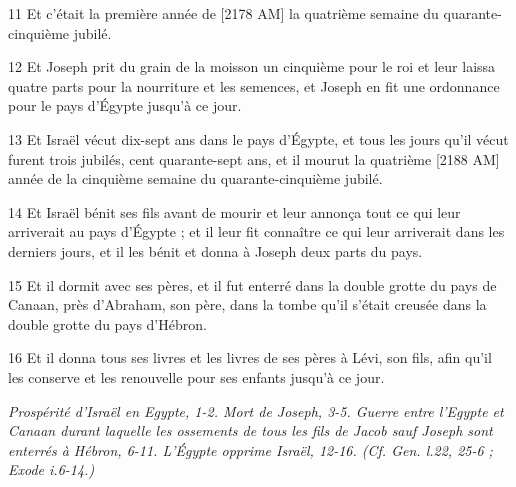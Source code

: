 \par 11 Et c'était la première année de [2178 AM] la quatrième semaine du quarante-cinquième jubilé.
\par 12 Et Joseph prit du grain de la moisson un cinquième pour le roi et leur laissa quatre parts pour la nourriture et les semences, et Joseph en fit une ordonnance pour le pays d'Égypte jusqu'à ce jour.
\par 13 Et Israël vécut dix-sept ans dans le pays d'Égypte, et tous les jours qu'il vécut furent trois jubilés, cent quarante-sept ans, et il mourut la quatrième [2188 AM] année de la cinquième semaine du quarante-cinquième jubilé.
\par 14 Et Israël bénit ses fils avant de mourir et leur annonça tout ce qui leur arriverait au pays d'Égypte ; et il leur fit connaître ce qui leur arriverait dans les derniers jours, et il les bénit et donna à Joseph deux parts du pays.
\par 15 Et il dormit avec ses pères, et il fut enterré dans la double grotte du pays de Canaan, près d'Abraham, son père, dans la tombe qu'il s'était creusée dans la double grotte du pays d'Hébron.
\par 16 Et il donna tous ses livres et les livres de ses pères à Lévi, son fils, afin qu'il les conserve et les renouvelle pour ses enfants jusqu'à ce jour.


\par \textit{Prospérité d'Israël en Egypte, 1-2. Mort de Joseph, 3-5. Guerre entre l'Egypte et Canaan durant laquelle les ossements de tous les fils de Jacob sauf Joseph sont enterrés à Hébron, 6-11. L'Égypte opprime Israël, 12-16. (Cf. Gen. l.22, 25-6 ; Exode i.6-14.)}

